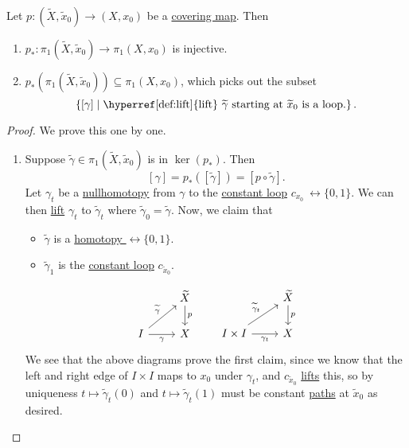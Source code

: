 \begin{proposition}
	Let \(p\colon (\widetilde{X} , \widetilde{x} _0)\to (X, x_0)\) be a \hyperref[def:covering-map]{covering map}. Then
	\begin{enumerate}[(1)]
		\item \(p_*\colon \pi _1(\widetilde{X} , \widetilde{x} _0)\to \pi _1(X, x_0)\) is injective.
		\item \(p_*(\pi _1(\widetilde{X} , \widetilde{x} _0))\subseteq \pi _1(X, x_0)\), which picks out the subset
		      \[
			      \left\{[\gamma ] \mid \text{\hyperref[def:lift]{lift} \(\widetilde{\gamma} \) starting at \(\widetilde{x} _0\) is a loop.} \right\}.
		      \]
	\end{enumerate}
\end{proposition}
\begin{proof}
	We prove this one by one.
	\begin{enumerate}[(1)]
		\item Suppose \(\widetilde{\gamma} \in \pi _1(\widetilde{X} , \widetilde{x} _0)\) is in \(\ker (p_*) \). Then
		      \[
			      [\gamma] =p_*([\widetilde{\gamma} ]) = \left[p \circ \widetilde{\gamma} \right].
		      \]
		      Let \(\gamma _{t}\) be a \hyperref[def:nullhomotopic]{nullhomotopy} from \(\gamma \) to the \hyperref[not:constant-loop]{constant loop}
		      \(c_{x_0}\ \rel \{0, 1\}\).
		      We can then \hyperref[def:lift]{lift} \(\gamma _{t}\) to \(\widetilde{\gamma} _{t}\) where \(\widetilde{\gamma} _0 = \widetilde{\gamma} \).
		      Now, we claim that
		      \begin{itemize}
			      \item \(\widetilde{\gamma} \) is a \hyperref[def:homotopy-relative]{homotopy \(\rel \{0, 1\}\)}.
			      \item \(\widetilde{\gamma} _1\) is the \hyperref[not:constant-loop]{constant loop} \(c_{\widetilde{x} _0}\).
		      \end{itemize}
		      \[
			      \begin{tikzcd}
				      & {\widetilde{X}} \\
				      I & X
				      \arrow["{\widetilde{\gamma}}", from=2-1, to=1-2]
				      \arrow["p", from=1-2, to=2-2]
				      \arrow["\gamma"', from=2-1, to=2-2]
			      \end{tikzcd}\qquad
			      \begin{tikzcd}
				      & {\widetilde{X}} \\
				      {I\times I} & X
				      \arrow["{\widetilde{\gamma}_t}", from=2-1, to=1-2]
				      \arrow["p", from=1-2, to=2-2]
				      \arrow["{\gamma_t}"', from=2-1, to=2-2]
			      \end{tikzcd}
		      \]
		      We see that the above diagrams prove the first claim, since we know that the left and right edge of \(I\times I\) maps to \(x_0\) under
		      \(\gamma _{t}\), and \(c_{\widetilde{x} _0}\) \hyperref[prop:homotopy-lifting-property]{lifts} this, so by uniqueness \(t\mapsto \widetilde{\gamma} _t(0)\) and
		      \(t\mapsto \widetilde{\gamma} _{t}(1)\) must be constant \hyperref[def:path]{paths} at \(\widetilde{x} _0\) as desired.


\end{enumerate}
\end{proof}
